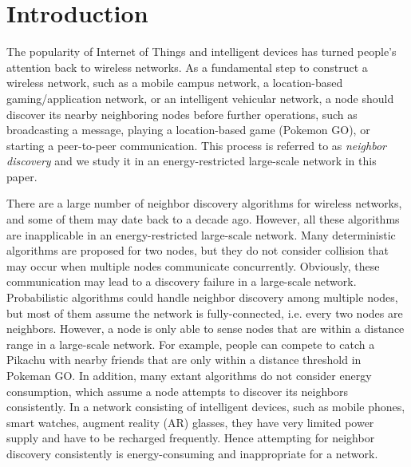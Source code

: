 \section{Introduction}






The popularity of Internet of Things and intelligent devices has turned people's attention back to wireless networks\cite{gupta2000capacity}. As a fundamental step to construct a wireless network, such as a mobile campus network, a location-based gaming/application network, or an intelligent vehicular network, a node should discover its nearby neighboring nodes before further operations, such as broadcasting a message, playing a location-based game (Pokemon GO), or starting a peer-to-peer communication. This process is referred to as \emph{neighbor discovery} and we study it in an energy-restricted large-scale network in this paper.

There are a large number of neighbor discovery algorithms for wireless networks, and some of them may date back to a decade ago.
However, all these algorithms are inapplicable in an energy-restricted large-scale network. Many deterministic algorithms are proposed for two nodes\cite{dutta2008practical, kandhalu2010u, bakht2012searchlight, sun2014hello,  chen2015heterogeneous, wang2015blinddate, qiu2016talk}, but they do not consider collision that may occur when multiple nodes communicate concurrently. Obviously, these communication may lead to a discovery failure in a large-scale network. Probabilistic algorithms could handle neighbor discovery among multiple nodes\cite{mcglynn2001birthday, vasudevan2009neighbor, you2011aloha}, but most of them assume the network is fully-connected, i.e. every two nodes are neighbors. However, a node is only able to sense nodes that are within a distance range in a large-scale network. For example, people can compete to catch a Pikachu with nearby friends that are only within a distance threshold in Pokeman GO. In addition, many extant algorithms do not consider energy consumption, which assume a node attempts to discover its neighbors consistently.
In a network consisting of intelligent devices, such as mobile phones, smart watches, augment reality (AR) glasses, they have very limited power supply and have to be recharged frequently. Hence attempting for neighbor discovery consistently is energy-consuming and inappropriate for a network.

